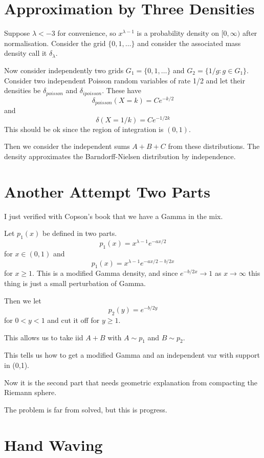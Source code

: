 \documentclass{amsart}
\begin{document}
\section{Approximation by Three Densities}

Suppose $\lambda<-3$ for convenience, so $x^{\lambda-1}$ is a probability density on $[0,\infty)$ after normalisation.  Consider the grid $\{0,1,\dots\}$ and consider the associated mass density call it $\delta_{\lambda}$.  

Now consider independently two grids $G_1 = \{ 0, 1, \dots \}$ and 
$G_2 = \{ 1/g : g \in G_1 \}$.  Consider two independent Poisson random variables of rate 1/2 and let their densities be $\delta_{poisson}$ and $\delta_{ipoisson}$.  These have
\[
\delta_{poisson}( X=k) = C e^{-k/2}
\]
and
\[
\delta( X = 1/k ) = C e^{-1/2k}
\]
This should be ok since the region of integration is $(0,1)$.

Then we consider the independent sums $A + B + C$ from these distributions.  The density approximates the Barndorff-Nielsen distribution by independence.

\section{Another Attempt Two Parts}

I just verified with Copson's book that we have a Gamma in the mix.

Let $p_1(x)$ be defined in two parts.
\[
p_1(x) = x^{\lambda-1} e^{-ax/2}
\]
for $x \in (0,1)$ and 
\[
p_1(x) = x^{\lambda-1} e^{-ax/2 - b/2x}
\]
for $x\ge 1$.  This is a modified Gamma density, and since $e^{-b/2x}\rightarrow 1$ as $x\rightarrow \infty$ this thing is just a small perturbation of Gamma.

Then we let 
\[
p_2(y) = e^{-b/2y}
\]
for $0<y<1$ and cut it off for $y\ge 1$.

This allows us to take iid $A+B$ with $A \sim p_1$ and $B \sim p_2$.

This tells us how to get a modified Gamma and an independent var with support in (0,1).

Now it is the second part that needs geometric explanation from compacting the Riemann sphere.

The problem is far from solved, but this is progress.

\section{Hand Waving}
\end{document}
